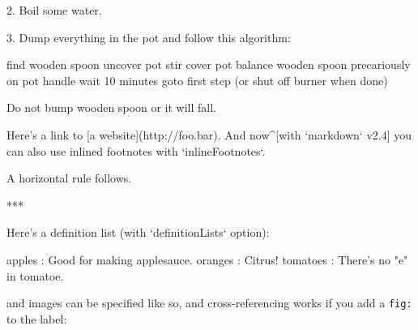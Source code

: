 \documentclass{article}
\begin{document}
\begin{markdown}
 2. Boil some water.

 3. Dump everything in the pot and follow
    this algorithm:

        find wooden spoon
        uncover pot
        stir
        cover pot
        balance wooden spoon precariously on pot handle
        wait 10 minutes
        goto first step (or shut off burner when done)

    Do not bump wooden spoon or it will fall.

Here's a link to [a website](http://foo.bar).  And now^[with `markdown` v2.4] you can also use inlined footnotes with `inlineFootnotes`.


A horizontal rule follows.

***

Here's a definition list (with `definitionLists` option):

apples
  : Good for making applesauce.
oranges
  : Citrus!
tomatoes
  : There's no "e" in tomatoe.

and images can be specified like so, and cross-referencing works if you add a \texttt{fig:} to the label: 
\end{markdown}













% 
% 
\end{document}
